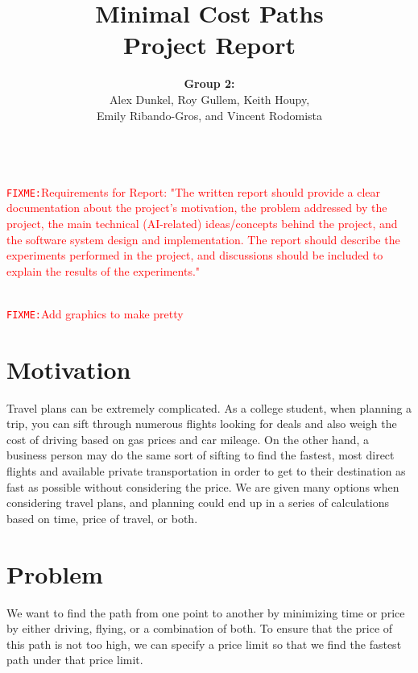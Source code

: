 \documentclass[11pt]{article}
\title{Minimal Cost Paths\\Project Report}
\author{ {\bf Group 2:} \\
Alex Dunkel,
Roy Gullem,
Keith Houpy, \\
Emily Ribando-Gros, and
Vincent Rodomista}
\newcommand{\FIXME}[1]{ \ \\ \hspace* {-1.5 cm}
  \textcolor{red}{\texttt{FIXME:}#1} \medskip\par}
\begin{document}
\maketitle

\FIXME{Requirements for Report:
"The written report should provide a clear documentation about the project's motivation, the problem addressed by the project, the main technical (AI-related) ideas/concepts behind the project, and the software system design and implementation. 
The report should describe the experiments performed in the project, and discussions should be included to explain the results of the experiments."}

\FIXME{Add graphics to make pretty}

\section{Motivation}

Travel plans can be extremely complicated. As a college student, when planning a trip, you can sift through numerous flights looking for deals and also weigh the cost of driving based on gas prices and car mileage. On the other hand, a business person may do the same sort of sifting to find the fastest, most direct flights and available private transportation in order to get to their destination as fast as possible without considering the price. We are given many options when considering travel plans, and planning could end up in a series of calculations based on time, price of travel, or both. 

\section{Problem}
We want to find the path from one point to another by minimizing time or price by either driving, flying, or a combination of both. To ensure that the price of this path is not too high, we can specify a price limit so that we find the fastest path under that price limit.
\end{document}
